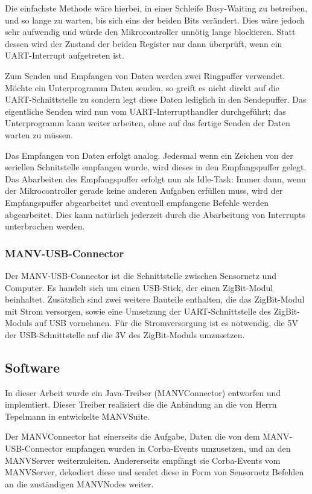 Die einfachste Methode wäre hierbei, in einer Schleife Busy-Waiting zu betreiben, und so lange zu warten,
bis sich eins der beiden Bits verändert. Dies wäre jedoch sehr aufwendig und würde den Mikrocontroller 
unnötig lange blockieren. Statt dessen wird der Zustand der beiden Register nur dann überprüft, wenn ein 
UART-Interrupt aufgetreten ist.

Zum Senden und Empfangen von Daten werden zwei Ringpuffer verwendet. Möchte ein Unterprogramm Daten senden,
so greift es nicht direkt auf die UART-Schnittstelle zu sondern legt diese Daten lediglich in den Sendepuffer.
Das eigentliche Senden wird nun vom UART-Interrupthandler durchgeführt; das Unterprogramm kann weiter arbeiten,
ohne auf das fertige Senden der Daten warten zu müssen.

Das Empfangen von Daten erfolgt analog. Jedesmal wenn ein Zeichen von der seriellen Schnitstelle empfangen
wurde, wird dieses in den Empfangspuffer gelegt. Das Abarbeiten des Empfangspuffer erfolgt nun als Idle-Task:
Immer dann, wenn der Mikrocontroller gerade keine anderen Aufgaben erfüllen muss, wird der Empfangspuffer
abgearbeitet und eventuell empfangene Befehle werden abgearbeitet. Dies kann natürlich jederzeit durch 
die Abarbeitung von Interrupts unterbrochen werden.

\subsubsection{MANV-USB-Connector}
Der MANV-USB-Connector ist die Schnittstelle zwischen Sensornetz und Computer. Es handelt sich um einen USB-Stick, der einen
ZigBit-Modul beinhaltet. Zusätzlich sind zwei weitere Bauteile enthalten, die das ZigBit-Modul mit Strom versorgen, sowie eine
Umsetzung der UART-Schnittstelle des ZigBit-Moduls auf USB vornehmen. Für die Stromversorgung ist es notwendig, die 5V der
USB-Schnittstelle auf die 3V des ZigBit-Moduls umzusetzen.

\subsection{Software}

In dieser Arbeit wurde ein Java-Treiber (MANVConnector) entworfen und implemtiert. Dieser Treiber realisiert die die Anbindung an
die von Herrn Tepelmann in \cite{Jan} entwickelte MANVSuite.

Der MANVConnector hat einerseits die Aufgabe, Daten die von dem MANV-USB-Connector empfangen wurden in Corba-Events 
umzusetzen, und an den MANVServer weiterzuleiten. Andererseits empfängt sie Corba-Events vom MANVServer, dekodiert
diese und sendet diese in Form von Sensornetz Befehlen an die zuständigen MANVNodes weiter.

